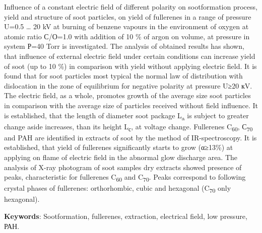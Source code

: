 Influence of a constant electric field of different polarity on
sootformation process, yield and structure of soot particles, on yield
of fullerenes in a range of pressure U=0.5 \ldots{} 20 kV at burning of
benzene vapours in the environment of oxygen at atomic ratio С/О=1.0
with addition of 10 \% of argon on volume, at pressure in system Р=40
Torr is investigated. The analysis of obtained results has shown, that
influence of external electric field under certain conditions can
increase yield of soot (up to 10 \%) in comparison with yield without
applying electric field. It is found that for soot particles most
typical the normal law of distribution with dislocation in the zone of
equilibrium for negative polarity at pressure U≥20 кV. The electric
field, as a whole, promotes growth of the average size soot particles in
comparison with the average size of particles received without field
influence. It is established, that the length of diameter soot package
L\textsubscript{a} is subject to greater change aside increases, than
its height L\textsubscript{с}, at voltage change. Fullerenes
C\textsubscript{60}, С\textsubscript{70} and PAH are identified in
extracts of soot by the method of IR-spectroscopy. It is established,
that yield of fullerenes significantly starts to grow (α≥13\%) at
applying on flame of electric field in the abnormal glow discharge area.
The analysis of X-ray photogram of soot samples dry extracts showed
presence of peaks, characteristic for fullerenes C\textsubscript{60} and
C\textsubscript{70}. Peaks correspond to following crystal phases of
fullerenes: orthorhombic, cubic and hexagonal (C\textsubscript{70} only
hexagonal).

{\bfseries Keywords}: Sootformation, fullerenes, extraction, electrical
field, low pressure, РАН.

